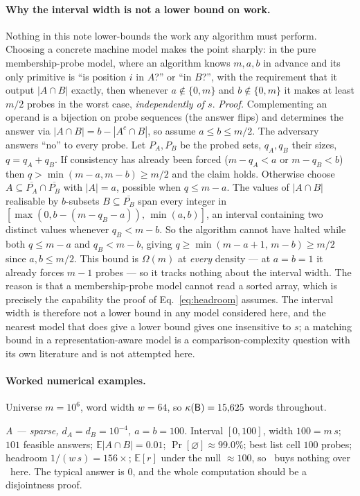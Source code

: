 \paragraph*{Why the interval width is not a lower bound on work.}
Nothing in this note lower-bounds the work any algorithm must perform. Choosing a concrete machine
model makes the point sharply: in the pure membership-probe model, where an algorithm knows $m,a,b$ in
advance and its only primitive is ``is position $i$ in $A$?'' or ``in $B$?'', with the requirement that
it output $|A\cap B|$ exactly, then whenever $a\notin\{0,m\}$ and $b\notin\{0,m\}$ it makes at least
$m/2$ probes in the worst case, \emph{independently of $s$}. \emph{Proof.} Complementing an operand is
a bijection on probe sequences (the answer flips) and determines the answer via
$|A\cap B|=b-|A^c\cap B|$, so assume $a\le b\le m/2$. The adversary answers ``no'' to every probe. Let
$P_A,P_B$ be the probed sets, $q_A,q_B$ their sizes, $q=q_A+q_B$. If consistency has already been
forced ($m-q_A<a$ or $m-q_B<b$) then $q>\min(m-a,m-b)\ge m/2$ and the claim holds. Otherwise choose
$A\subseteq\overline{P_A}\cap\overline{P_B}$ with $|A|=a$, possible when $q\le m-a$. The values of
$|A\cap B|$ realisable by $b$-subsets $B\subseteq\overline{P_B}$ span every integer in
$[\max(0,b-(m-q_B-a)),\,\min(a,b)]$, an interval containing two distinct values whenever $q_B<m-b$. So
the algorithm cannot have halted while both $q\le m-a$ and $q_B<m-b$, giving
$q\ge\min(m-a+1,\,m-b)\ge m/2$ since $a,b\le m/2$. This bound is $\Omega(m)$ at \emph{every} density
--- at $a=b=1$ it already forces $m-1$ probes --- so it tracks nothing about the interval width. The
reason is that a membership-probe model cannot read a sorted array, which is precisely the capability
the proof of Eq.~\eqref{eq:headroom} assumes. The interval width is therefore not a lower bound
in any model considered here, and the nearest model that does give a lower bound gives one insensitive
to $s$; a matching bound in a representation-aware model is a comparison-complexity question with its
own literature and is not attempted here.

\paragraph*{Worked numerical examples.} Universe $m=10^6$, word width $w=64$, so
$\kappa(\textsf{B})=15{,}625$ words throughout.

\emph{A --- sparse, $d_A=d_B=10^{-4}$, $a=b=100$.} Interval $[0,100]$, width $100=m\,s$; $101$
feasible answers; $\mathbb{E}|A\cap B|=0.01$; $\Pr[\varnothing]\approx99.0\%$; best list cell $100$
probes; headroom $1/(w\,s)=156\times$; $\mathbb{E}[r]$ under the null $\approx100$, so \rR\ buys
nothing over \rS\ here. The typical answer is $0$, and the whole computation should be a disjointness
proof.

